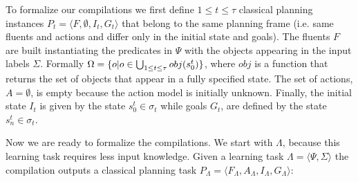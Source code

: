 \documentclass[letterpaper]{article} %
\newcommand{\tup}[1]{{\langle #1 \rangle}}
\begin{document}
To formalize our compilations we first define {\small $1\leq t\leq \tau$} classical planning instances $P_t=\tup{F,\emptyset,I_t,G_t}$ that belong to the same planning frame (i.e. same fluents and actions and differ only in the initial state and goals). The fluents $F$ are built instantiating the predicates in $\Psi$ with the objects appearing in the input labels $\Sigma$. Formally $\Omega=\{o|o\in \bigcup_{\small 1\leq t\leq \tau} obj(s_0^t)\}$, where $obj$ is a function that returns the set of objects that appear in a fully specified state. The set of actions, $A=\emptyset$, is empty because the action model is initially unknown. Finally, the initial state $I_t$ is given by the state $s_0^t\in \sigma_t$ while goals $G_t$, are defined by the state $s_n^t\in \sigma_t$.

Now we are ready to formalize the compilations. We start with $\Lambda$, because this learning task requires less input knowledge. Given a learning task $\Lambda=\tup{\Psi,\Sigma}$ the compilation outputs a classical planning task $P_{\Lambda}=\tup{F_{\Lambda},A_{\Lambda},I_{\Lambda},G_{\Lambda}}$:
\end{document}
